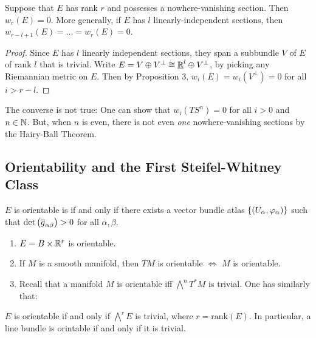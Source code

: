 \documentclass[main.tex]{subfiles}
\begin{document}
\begin{prop}
  Suppose that $E$ has rank $r$ and possesses a nowhere-vanishing section. Then $w_r(E) = 0$. More generally, if $E$ has $l$ linearly-independent sections, then $w_{r - l + 1}(E) = \dots = w_r(E) = 0$.
\end{prop}

\begin{proof}
  Since $E$ has $l$ linearly independent sections, they span a subbundle $V$ of $E$ of rank $l$ that is trivial. Write $E = V \oplus V^\perp \cong \underline{\mathbb{R}}^l \oplus V^\perp$, by picking any Riemannian metric on $E$. Then by Proposition 3, $w_i(E) = w_i(V^\perp) = 0$ for all $i > r - l$.
\end{proof}

\begin{note}
  The converse is not true: One can show that $w_i(TS^n) = 0$ for all $i > 0$ and $n \in \mathbb{N}$. But, when $n$ is even, there is not even {\it one} nowhere-vanishing sections by the Hairy-Ball Theorem.
\end{note}

\subsection{Orientability and the First Steifel-Whitney Class}

\begin{defn}
  $E$ is orientable is  if and only if there exists a vector bundle atlas $\left\{\left( U_\alpha, \varphi_\alpha \right)\right\}$ such that $\det\left( \overline{g}_{\alpha \beta} \right) > 0$ for all $\alpha, \beta$.
\end{defn}

\begin{exmp}
  \hspace{1em}
  \begin{enumerate}
    \item $E = B \times \mathbb{R}^r$ is orientable.
    \item If $M$ is a smooth manifold, then $TM$ is orientable $\iff$ $M$ is orientable.
    \item Recall that a manifold $M$ is orientable iff $\bigwedge^n T^*M$ is trivial. One has similarly that:
  \end{enumerate}
\end{exmp}

\begin{prop}
  $E$ is orientable if and only if $\bigwedge^r E$ is trivial, where $r = \text{rank}(E)$. In particular, a line bundle is orintable if and only if it is trivial.
\end{prop}
\end{document}
